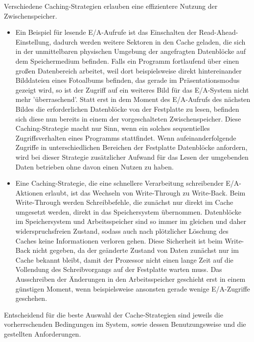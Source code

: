 \documentclass[
	12pt,
	a4paper,
	BCOR10mm,
	DIV14,
	listof=totoc,
	bibliography=totoc,
	headsepline
]{scrreprt}
\begin{document}
Verschiedene Caching-Strategien erlauben eine effizientere Nutzung der Zwischenspeicher.
\begin{itemize}
\item Ein Beispiel für lesende E/A-Aufrufe ist das Einschalten der Read-Ahead-Einstellung, dadurch werden weitere Sektoren in den Cache geladen, die sich in der unmittelbaren physischen Umgebung der angefragten Datenblöcke auf dem  Speichermedium befinden. Falls ein Programm fortlaufend über einen großen Datenbereich arbeitet, weil dort beispielsweise direkt hintereinander Bilddateien eines Fotoalbums befinden, das gerade im Präsentationsmodus gezeigt wird, so ist der Zugriff auf ein weiteres Bild für das E/A-System nicht mehr 'überraschend'. Statt erst in dem Moment des E/A-Aufrufs des nächsten Bildes die erforderlichen Datenblöcke von der Festplatte zu lesen, befinden sich diese nun bereits in einem der vorgeschalteten Zwischenspeicher. Diese Caching-Strategie macht nur Sinn, wenn ein solches sequentielles Zugriffsverhalten eines Programms stattfindet. 
Wenn aufeinanderfolgende Zugriffe in unterschiedlichen Bereichen der Festplatte Datenblöcke anfordern, wird bei dieser Strategie zusätzlicher Aufwand für das Lesen der umgebenden Daten betrieben ohne davon einen Nutzen zu haben. 
\item Eine Caching-Strategie, die eine schnellere Verarbeitung schreibender E/A-Aktionen erlaubt, ist das Wechseln von Write-Through zu Write-Back. Beim Write-Through werden Schreibbefehle, die zunächst nur direkt im Cache umgesetzt werden, direkt in das Speichersystem übernommen. Datenblöcke im Speichersystem und Arbeitsspeicher sind so immer im gleichen und daher widerspruchsfreien Zustand, sodass auch nach plötzlicher Löschung des Caches keine Informationen verloren gehen.
Diese Sicherheit ist beim Write-Back nicht gegeben, da der geänderte Zustand von Daten zunächst nur im Cache bekannt bleibt, damit der Prozessor nicht einen lange Zeit auf die Vollendung des Schreibvorgangs auf der Festplatte warten muss. Das Ausschreiben der Änderungen in den Arbeitsspeicher geschieht erst in einem günstigen Moment, wenn beispielsweise ansonsten gerade wenige E/A-Zugriffe geschehen.
\end{itemize}
Entscheidend für die beste Auswahl der Cache-Strategien sind jeweils die vorherrschenden Bedingungen im System, sowie dessen Benutzungsweise und die gestellten Anforderungen.
\end{document}
